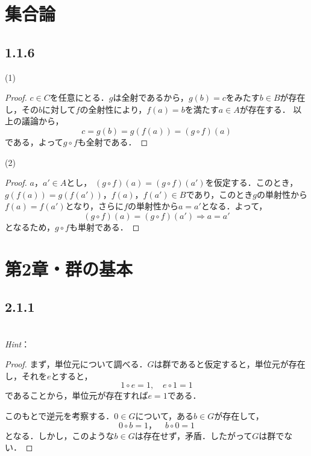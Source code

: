 \documentclass[dvipdfmx,uplatex,11pt]{jsarticle}
\begin{document}
%
\section{集合論}
%
\subsection{1.1.6}
(1)
\begin{leftbar}
    \begin{proof}
        $c \in C$を任意にとる．$g$は全射であるから，$g(b)=c$をみたす$b \in B$が存在し，その$b$に対して$f$の全射性により，$f(a)=b$を満たす$a \in A$が存在する．
        以上の議論から，
        \[
            c = g(b)= g(f(a))=(g \circ f) (a)
        \]
        である，よって$g \circ f$も全射である．
    \end{proof}
\end{leftbar}
(2)
\begin{leftbar}
    \begin{proof}
       $a ，a' \in A$とし， $(g \circ f)(a)= (g \circ f) (a')$を仮定する．このとき，$g(f(a))=g(f(a'))$，$f(a)，f(a') \in B$であり，このとき$g$の単射性から$f(a)= f(a')$となり，さらに$f$の単射性から$a=a'$となる．よって，
       \[
        (g \circ f)(a)= (g \circ f) (a') \Longrightarrow a=a'
       \]
       となるため，$g \circ f$も単射である．
    \end{proof}
\end{leftbar}
%
%
\newpage
%
\section{第2章・群の基本}

\subsection{2.1.1}
\noindent
\\
\textsl{Hint}：\\
\dotfill

\begin{leftbar}
\begin{proof}
まず，単位元について調べる．$G$は群であると仮定すると，単位元が存在し，それを$e$とすると，
\[
1 \circ e =1 ,\quad e \circ 1 =1
\]
であることから，単位元が存在すれば$e=1$である．\par
このもとで逆元を考察する．$ 0 \in G$について，ある$b \in G$が存在して，
\[
0 \circ b = 1，\quad b \circ 0 =1
\]
となる．しかし，このような$b \in G$は存在せず，矛盾．したがって$G$は群でない．
\end{proof}
\end{leftbar}
\end{document}
